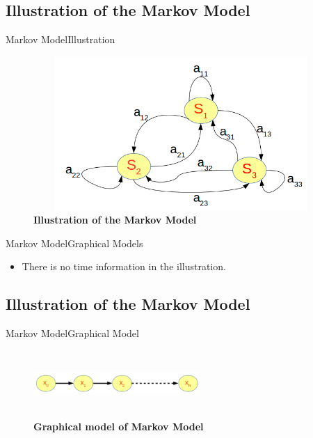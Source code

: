 \documentclass[10pt]{beamer}
\begin{document}
\subsection{Illustration of the Markov Model}
\begin{frame}{Markov Model}{Illustration}
  \begin{figure}[h]
    \centering
    \includegraphics[width=4.5in,height=2.3in]{figures/illustration_markov_model.png}
    \caption {\textbf{Illustration of the Markov Model}}
  \end{figure}
\end{frame}

\begin{frame}{Markov Model}{Graphical Models}
  \begin{itemize}
      \item There is no time information in the illustration.
  \end{itemize}
\end{frame}

\subsection{Illustration of the Markov Model}
\begin{frame}{Markov Model}{Graphical Model}
  \begin{figure}[h]
    \centering
    \includegraphics[width=2.5in,height=1in]{figures/graphical_models.png}
    \caption {\textbf{Graphical model of Markov Model}}
  \end{figure}
\end{frame}
\end{document}
